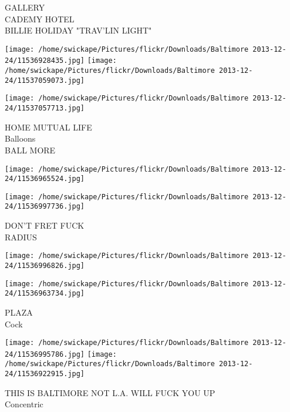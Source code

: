 \documentclass[10pt,letterpaper]{article}
\begin{document}
GALLERY\\
CADEMY HOTEL\\
BILLIE HOLIDAY "TRAV'LIN LIGHT"
\pagebreak

\texttt{[image: /home/swickape/Pictures/flickr/Downloads/Baltimore 2013-12-24/11536928435.jpg]}
\texttt{[image: /home/swickape/Pictures/flickr/Downloads/Baltimore 2013-12-24/11537059073.jpg]}

\texttt{[image: /home/swickape/Pictures/flickr/Downloads/Baltimore 2013-12-24/11537057713.jpg]}

HOME MUTUAL LIFE\\
Balloons\\
BALL MORE
\pagebreak

\texttt{[image: /home/swickape/Pictures/flickr/Downloads/Baltimore 2013-12-24/11536965524.jpg]}

\vspace{0.25in}
\texttt{[image: /home/swickape/Pictures/flickr/Downloads/Baltimore 2013-12-24/11536997736.jpg]}

DON'T FRET FUCK\\
RADIUS
\pagebreak

\texttt{[image: /home/swickape/Pictures/flickr/Downloads/Baltimore 2013-12-24/11536996826.jpg]}

\vspace{0.25in}
\texttt{[image: /home/swickape/Pictures/flickr/Downloads/Baltimore 2013-12-24/11536963734.jpg]}

PLAZA\\
Cock
\pagebreak

\texttt{[image: /home/swickape/Pictures/flickr/Downloads/Baltimore 2013-12-24/11536995786.jpg]}
\texttt{[image: /home/swickape/Pictures/flickr/Downloads/Baltimore 2013-12-24/11536922915.jpg]}

THIS IS BALTIMORE NOT L.A. WILL FUCK YOU UP\\
Concentric
\pagebreak
\end{document}
